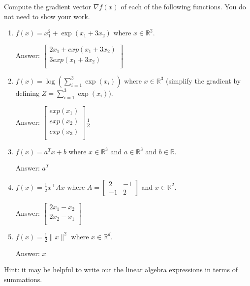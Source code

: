 \documentclass{article}
\newcommand{\blu}[1]{{\textcolor{blu}{#1}}}
\newenvironment{answer}{\par\begingroup\color{gre}Answer: }{\endgroup}
\let\ask\blu
\def\R{\mathbb{R}}
\newcommand{\norm}[1]{\lVert #1 \rVert}
\begin{document}
  \ask{Compute the gradient vector $\nabla f(x)$ of each of the following functions.} You do not need to show your work.
  \begin{enumerate}
  \item $f(x) = x_1^2 + \exp(x_1 + 3x_2)$ where $x \in \R^2$.
  \begin{answer}
    $\left[ \begin{array}{c}
      2x_1 + exp(x_1 + 3x_2) \\
      3exp(x_1 + 3x_2) \\
    \end{array} \right]$
  \end{answer}
  \item $f(x) = \log\left(\sum_{i=1}^3\exp(x_i)\right)$ where $x \in \R^3$ (simplify the gradient by defining $Z = \sum_{i=1}^3\exp(x_i)$).
  \begin{answer}
    $ \left[ \begin{array}{c}
      exp(x_1)\\
      exp(x_2)\\
      exp(x_3)\\
    \end{array}\right]\frac{1}{Z} $
  \end{answer}
  \item $f(x) = a^Tx + b$ where $x \in \R^3$ and $a \in \R^3$ and $b \in \R$.
  \begin{answer}
    $a^T$
  \end{answer}
  \item $f(x) = \frac12 x^\top A x$ where $A=\left[ \begin{array}{cc}
  2 & -1 \\
  -1 & 2 \end{array} \right]$ and $x \in \mathbb{R}^2$.
  \begin{answer}
    $ \left[ \begin{array}{c}
      2x_1 - x_2 \\
      2x_2 - x_1 \\
    \end{array} \right] $
  \end{answer}
  \item $f(x) = \frac{1}{2}\norm{x}^2$ where $x \in \R^d$.
  \begin{answer}
    $ x$
  \end{answer}
  \end{enumerate}

  Hint: it may be helpful to write out the linear algebra expressions in terms of summations.
\end{document}
